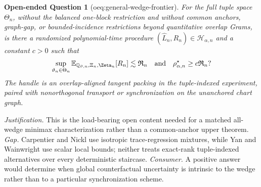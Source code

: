 \documentclass{article}
\newtheorem{openendedquestion}{Open-ended Question}
\begin{document}
\begin{openendedquestion}[oeq:general-wedge-frontier]\label{oeq:general-wedge-frontier}
For the full tuple space \(\Theta_n\), without the balanced one-block restriction and without common anchors, graph-gap, or bounded-incidence restrictions beyond quantitative overlap Grams, is there a randomized polynomial-time procedure \((\widehat L_n,R_n)\in\mathcal H_{\alpha,n}\) and a constant \(c>0\) such that \[\sup_{\vartheta_n\in\Theta_n}\mathbb E_{\mathbb Q_{\vartheta,n},\Xi_n,\Zeta_n}[R_n]\lesssim\mathfrak R_n\quad\text{and}\quad\rho_{\alpha,n}^{\star}\ge c\mathfrak R_n?\] The handle is an overlap-aligned tangent packing in the tuple-indexed experiment, paired with nonorthogonal transport or synchronization on the unanchored chart graph.
\end{openendedquestion}
\par\smallskip\noindent \textit{Justification.} This is the load-bearing open content needed for a matched all-wedge minimax characterization rather than a common-anchor upper theorem. \textit{Gap.} Carpentier and Nickl use isotropic trace-regression mixtures, while Yan and Wainwright use scalar local bounds; neither treats exact-rank tuple-indexed alternatives over every deterministic staircase. \textit{Consumer.} A positive answer would determine when global counterfactual uncertainty is intrinsic to the wedge rather than to a particular synchronization scheme.
\end{document}
